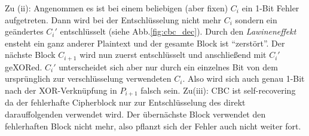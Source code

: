 Zu (ii): Angenommen es ist bei einem beliebigen (aber fixen) $C_i$ ein 1-Bit Fehler
aufgetreten. Dann wird bei der Entschlüsselung nicht mehr $C_i$ sondern ein 
geändertes $C_i'$ entschlüsselt (siehe Abb.\ref{fig:cbc_dec}). Durch den 
\textit{Lawineneffekt} ensteht ein ganz anderer Plaintext und der gesamte 
Block ist "`zerstört"'. Der nächste Block $C_{i+1}$ wird nun zuerst entschlüsselt
und anschließend mit $C_{i}'$ geXORed. $C_{i}'$ unterscheidet sich aber nur
durch ein einzelnes Bit von dem ursprünglich zur verschlüsselung verwendeten 
$C_i$. Also wird sich auch genau 1-Bit nach der XOR-Verknüpfung in $P_{i+1}$ 
falsch sein.\vspace*{1em}\newline
Zu(iii): CBC ist self-recovering da der fehlerhafte Cipherblock nur zur Entschlüsselung
des direkt darauffolgenden verwendet wird. Der übernächste Block verwendet den fehlerhaften
Block nicht mehr, also pflanzt sich der Fehler auch nicht weiter fort.